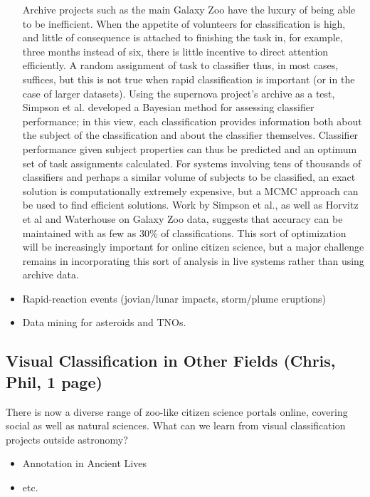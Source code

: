 \documentclass{ar2e}
\begin{document}
\begin{itemize}
Archive projects such as the main Galaxy Zoo have the luxury of being able to
be inefficient. When the appetite of volunteers for classification is high,
and little of consequence is attached to finishing the task in, for example,
three months instead of six, there is little incentive to direct attention
efficiently. A random assignment of task to classifier thus, in most cases,
suffices, but this is not true when rapid classification is important (or in
the case of larger datasets). Using the supernova project's archive as a test,
Simpson et al. developed a Bayesian method for assessing classifier
performance; in this view, each classification provides information both about
the subject of the classification and about the classifier themselves.
Classifier performance given subject properties can thus be predicted and an
optimum set of task assignments calculated. For systems involving tens of
thousands of classifiers and perhaps a similar volume of subjects to be
classified, an exact solution is computationally extremely expensive, but a
MCMC approach can be used to find efficient solutions. Work by Simpson et al.,
as well as Horvitz et al and Waterhouse on Galaxy Zoo data, suggests that
accuracy can be maintained with as few as 30\% of classifications. This sort
of optimization will be increasingly important for online citizen science, but
a major challenge remains in incorporating this sort of analysis in live
systems rather than using archive data. 

\item Rapid-reaction events (jovian/lunar impacts, storm/plume eruptions)
\item Data mining for asteroids and TNOs.
\end{itemize}



\subsection{Visual Classification in Other Fields (\textbf{Chris}, Phil, 1 page)}
\label{sec:class:non-astro}

There is now a diverse range of zoo-like citizen science portals online,
covering social as well as natural sciences. What can we learn from visual
classification projects outside astronomy?

\begin{itemize}
\item Annotation in Ancient Lives
\item etc.
\end{itemize}
\end{document}
